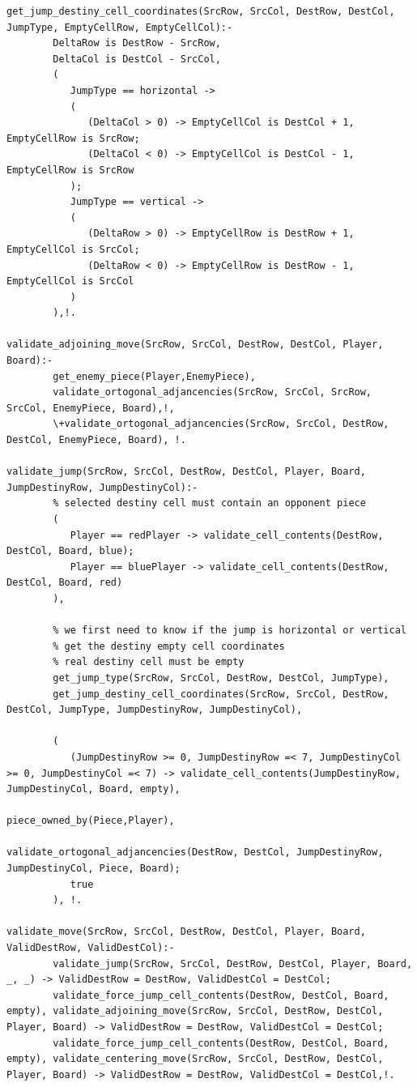 \documentclass[a4paper]{article}
\begin{document}
\begin{lstlisting}[style=customprologwithlines]
get_jump_destiny_cell_coordinates(SrcRow, SrcCol, DestRow, DestCol, JumpType, EmptyCellRow, EmptyCellCol):-
        DeltaRow is DestRow - SrcRow,
        DeltaCol is DestCol - SrcCol,
        (
           JumpType == horizontal -> 
           (
              (DeltaCol > 0) -> EmptyCellCol is DestCol + 1, EmptyCellRow is SrcRow;
              (DeltaCol < 0) -> EmptyCellCol is DestCol - 1, EmptyCellRow is SrcRow
           );
           JumpType == vertical -> 
           (
              (DeltaRow > 0) -> EmptyCellRow is DestRow + 1, EmptyCellCol is SrcCol;
              (DeltaRow < 0) -> EmptyCellRow is DestRow - 1, EmptyCellCol is SrcCol
           )
        ),!.

validate_adjoining_move(SrcRow, SrcCol, DestRow, DestCol, Player, Board):-
        get_enemy_piece(Player,EnemyPiece),
        validate_ortogonal_adjancencies(SrcRow, SrcCol, SrcRow, SrcCol, EnemyPiece, Board),!,
        \+validate_ortogonal_adjancencies(SrcRow, SrcCol, DestRow, DestCol, EnemyPiece, Board), !.

validate_jump(SrcRow, SrcCol, DestRow, DestCol, Player, Board, JumpDestinyRow, JumpDestinyCol):-
        % selected destiny cell must contain an opponent piece
        (
           Player == redPlayer -> validate_cell_contents(DestRow, DestCol, Board, blue);
           Player == bluePlayer -> validate_cell_contents(DestRow, DestCol, Board, red)
        ),

        % we first need to know if the jump is horizontal or vertical
        % get the destiny empty cell coordinates
        % real destiny cell must be empty
        get_jump_type(SrcRow, SrcCol, DestRow, DestCol, JumpType),
        get_jump_destiny_cell_coordinates(SrcRow, SrcCol, DestRow, DestCol, JumpType, JumpDestinyRow, JumpDestinyCol),

        (
           (JumpDestinyRow >= 0, JumpDestinyRow =< 7, JumpDestinyCol >= 0, JumpDestinyCol =< 7) -> validate_cell_contents(JumpDestinyRow, JumpDestinyCol, Board, empty),
                                                                                                   piece_owned_by(Piece,Player),
                                                                                                   validate_ortogonal_adjancencies(DestRow, DestCol, JumpDestinyRow, JumpDestinyCol, Piece, Board);
           true
        ), !.

validate_move(SrcRow, SrcCol, DestRow, DestCol, Player, Board, ValidDestRow, ValidDestCol):-
        validate_jump(SrcRow, SrcCol, DestRow, DestCol, Player, Board, _, _) -> ValidDestRow = DestRow, ValidDestCol = DestCol;
        validate_force_jump_cell_contents(DestRow, DestCol, Board, empty), validate_adjoining_move(SrcRow, SrcCol, DestRow, DestCol, Player, Board) -> ValidDestRow = DestRow, ValidDestCol = DestCol;
        validate_force_jump_cell_contents(DestRow, DestCol, Board, empty), validate_centering_move(SrcRow, SrcCol, DestRow, DestCol, Player, Board) -> ValidDestRow = DestRow, ValidDestCol = DestCol,!.


\end{lstlisting}
\end{document}
